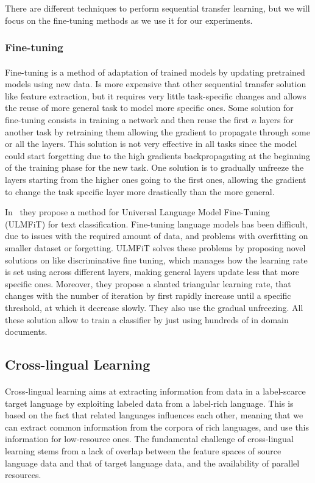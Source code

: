 There are different techniques to perform sequential transfer learning, but we will focus on the fine-tuning methods as we use it for our experiments. 

\subsubsection{Fine-tuning}
\paragraph{}
Fine-tuning is a method of adaptation of trained models by updating pretrained models using new data. Is more expensive that other sequential transfer solution like feature extraction, but it requires very little task-specific changes and allows the reuse of more general task to model more specific ones.
Some solution for fine-tuning consists in training a network and then reuse the first $n$ layers for another task by retraining them allowing the gradient to propagate through some or all the layers. This solution is not very effective in all tasks since the model could start forgetting due to the high gradients backpropagating at the beginning of the training phase for the new task. One solution is to gradually unfreeze the layers starting from the higher ones going to the first ones, allowing the gradient to change the task specific layer more drastically than the more general. 

In~\citep{howard-ruder-2018-universal} they propose a method for Universal Language Model Fine-Tuning (ULMFiT) for text classification. Fine-tuning language models has been difficult, due to issues with the required amount of data, and problems with overfitting on smaller dataset or forgetting. ULMFiT solves these problems by proposing novel solutions on like discriminative fine tuning, which manages how the learning rate is set using across different layers, making general layers update less that more specific ones. Moreover, they propose a slanted triangular learning rate, that changes with the number of iteration by first rapidly increase until a specific threshold, at which it decrease slowly. They also use the gradual unfreezing. All these solution allow to train a classifier by just using hundreds of in domain documents.

\subsection{Cross-lingual Learning}
\paragraph{}
Cross-lingual learning aims at extracting information from data in a label-scarce target language by exploiting labeled data from a label-rich language. This is based on the fact that related languages influences each other, meaning that we can extract common information from the corpora of rich languages, and use this information for low-resource ones.  The fundamental challenge of cross-lingual learning stems from a lack of overlap between the feature spaces of source language data and that of target language data, and the availability of parallel resources. 

